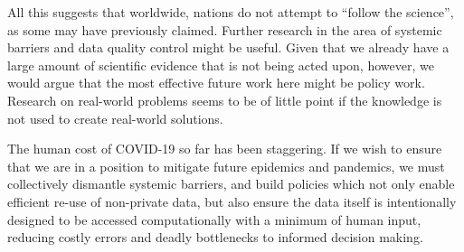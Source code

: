 \documentclass{CUP-JNL-DAP}%
\begin{document}
All this suggests that worldwide, nations do not attempt to “follow the science”, as some may have previously claimed. Further research in the area of systemic barriers and data quality control might be useful. Given that we already have a large amount of scientific evidence that is not being acted upon, however, we would argue that the most effective future work here might be policy work. Research on real-world problems seems to be of little point if the knowledge is not used to create real-world solutions. 

The human cost of COVID-19 so far has been staggering. If we wish to ensure that we are in a position to mitigate future epidemics and pandemics, we must collectively dismantle systemic barriers, and build policies which not only enable efficient re-use of non-private data, but also ensure the data itself is intentionally designed to be accessed computationally with a minimum of human input, reducing costly errors and deadly bottlenecks to informed decision making. 
\end{document}
